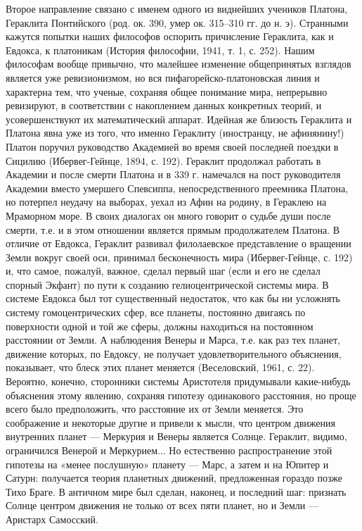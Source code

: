 Второе  направление  связано с  именем  одного  из виднейших  учеников
Платона,  Гераклита  Понтийского  (род.  ок. 390,  умер  ок.  315--310
гг.  до н.  э).  Странными кажутся  попытки  наших философов  оспорить
причисление Гераклита, как и Евдокса, к платоникам (История философии,
1941, т.  1, с.  252). Нашим философам  вообще привычно,  что малейшее
изменение  общепринятых   взглядов  является  уже   ревизионизмом,  но
вся  пифагорейско-платоновская линия  и  характерна  тем, что  ученые,
сохраняя общее  понимание мира, непрерывно ревизируют,  в соответствии
с  накоплением   данных  конкретных   теорий,  и   усовершенствуют  их
математический аппарат.  Идейная же близость Гераклита  и Платона явна
уже из того,  что именно Гераклиту (иностранцу,  не афинянину!) Платон
поручил  руководство  Академией во  время  своей  последней поездки  в
Сицилию (Ибервег-Гейнце, 1894, с.  192). Гераклит продолжал работать в
Академии  и  после  смерти  Платона  и в  339  г.  намечался  на  пост
руководителя  Академии  вместо умершего  Спевсиппа,  непосредственного
преемника Платона,  но потерпел неудачу  на выборах, уехал из  Афин на
родину,  в Гераклею  на  Мраморном  море. В  своих  диалогах он  много
говорит о судьбе  души после смерти, т.е. и в  этом отношении является
прямым продолжателем Платона. В  отличие от Евдокса, Гераклит развивал
филолаевское представление о вращении Земли вокруг своей оси, принимал
бесконечность  мира (Ибервег-Гейнце,  с. 192)  и, что  самое, пожалуй,
важное, сделал  первый шаг (если  и его  не сделал спорный  Экфант) по
пути  к созданию  гелиоцентрической  системы мира.  В системе  Евдокса
был  тот существенный  недостаток,  что как  бы  ни усложнять  систему
гомоцентрических сфер, все планеты,  постоянно двигаясь по поверхности
одной и  той же сферы,  должны находиться на постоянном  расстоянии от
Земли. А наблюдения Венеры и Марса,  т.е. как раз тех планет, движение
которых,  по  Евдоксу,  не  получает  удовлетворительного  объяснения,
показывает,  что блеск  этих  планет меняется  (Веселовский, 1961,  с.
22).  Вероятно,  конечно,  сторонники системы  Аристотеля  придумывали
какие-нибудь объяснения  этому явлению, сохраняя  гипотезу одинакового
расстояния, но  проще всего  было предположить,  что расстояние  их от
Земли меняется. Это соображение и  некоторые другие и привели к мысли,
что центром движения внутренних планет  --- Меркурия и Венеры является
Солнце.  Гераклит,  видимо,  ограничился  Венерой  и  Меркурием...  Но
естественно распространение этой гипотезы на «менее послушную» планету
--- Марс,  а затем и на  Юпитер и Сатурн: получается  теория планетных
движений, предложенная гораздо  позже Тихо Браге. В  античном мире был
сделан, наконец, и последний шаг:  признать Солнце центром движения не
только от всех пяти планет, но и Земли --- Аристарх Самосский.

